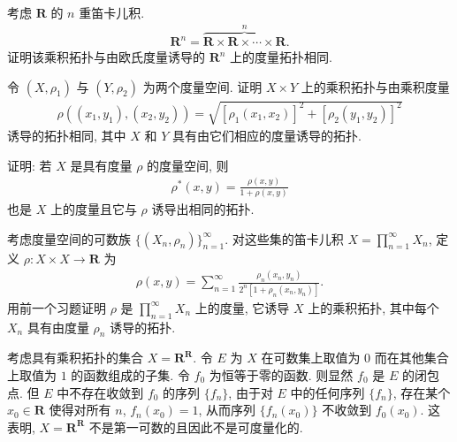 \documentclass[../../main.tex]{subfiles}
\begin{document}
\begin{exercise}\label{exercise:ch12-13}
考虑 $\mathbf{R}$ 的 $n$ 重笛卡儿积.
\begin{align*}
\mathbf{R}^{n}=\overbrace{\mathbf{R}\times\mathbf{R}\times\cdots\times\mathbf{R}}^{n}.
\end{align*}
证明该乘积拓扑与由欧氏度量诱导的 $\mathbf{R}^{n}$ 上的度量拓扑相同.
\end{exercise}

\begin{exercise}\label{exercise:ch12-14}
令 $(X,\rho_{1})$ 与 $(Y,\rho_{2})$ 为两个度量空间. 证明 $X\times Y$ 上的乘积拓扑与由乘积度量
\begin{align*}
\rho((x_{1},y_{1}),(x_{2},y_{2}))=\sqrt{[\rho_{1}(x_{1},x_{2})]^{2}+[\rho_{2}(y_{1},y_{2})]^{2}}
\end{align*}
诱导的拓扑相同, 其中 $X$ 和 $Y$ 具有由它们相应的度量诱导的拓扑.
\end{exercise}

\begin{exercise}\label{exercise:ch12-15}
证明: 若 $X$ 是具有度量 $\rho$ 的度量空间, 则
\begin{align*}
\rho^{*}(x,y)=\frac{\rho(x,y)}{1+\rho(x,y)}
\end{align*}
也是 $X$ 上的度量且它与 $\rho$ 诱导出相同的拓扑.
\end{exercise}

\begin{exercise}\label{exercise:ch12-16}
考虑度量空间的可数族 $\{(X_{n},\rho_{n})\}_{n=1}^{\infty}$. 对这些集的笛卡儿积 $X=\prod_{n=1}^{\infty}X_{n}$, 定义 $\rho:X\times X\to\mathbf{R}$ 为
\begin{align*}
\rho(x,y)=\sum_{n=1}^{\infty}\frac{\rho_{n}(x_{n},y_{n})}{2^{n}[1+\rho_{n}(x_{n},y_{n})]}.
\end{align*}
用前一个习题证明 $\rho$ 是 $\prod_{n=1}^{\infty}X_{n}$ 上的度量, 它诱导 $X$ 上的乘积拓扑, 其中每个 $X_{n}$ 具有由度量 $\rho_{n}$ 诱导的拓扑.
\end{exercise}

\begin{exercise}\label{exercise:ch12-17}
考虑具有乘积拓扑的集合 $X=\mathbf{R}^{\mathbf{R}}$. 令 $E$ 为 $X$ 在可数集上取值为 $0$ 而在其他集合上取值为 $1$ 的函数组成的子集. 令 $f_{0}$ 为恒等于零的函数. 则显然 $f_{0}$ 是 $E$ 的闭包点. 但 $E$ 中不存在收敛到 $f_{0}$ 的序列 $\{f_{n}\}$, 由于对 $E$ 中的任何序列 $\{f_{n}\}$, 存在某个 $x_{0}\in\mathbf{R}$ 使得对所有 $n$, $f_{n}(x_{0})=1$, 从而序列 $\{f_{n}(x_{0})\}$ 不收敛到 $f_{0}(x_{0})$. 这表明, $X=\mathbf{R}^{\mathbf{R}}$ 不是第一可数的且因此不是可度量化的.
\end{exercise}
\end{document}
